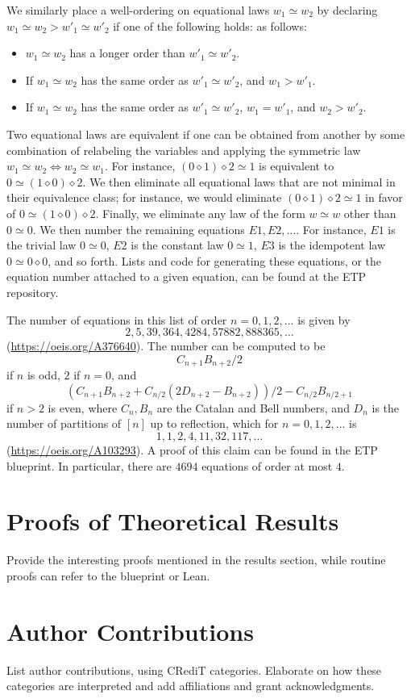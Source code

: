 \documentclass[12pt]{article}
\theoremstyle{definition}
\newcommand{\op}{\diamond}
\newcommand{\formaleq}{\simeq}
\begin{document}
We similarly place a well-ordering on equational laws $w_1 \formaleq w_2$ by declaring $w_1 \formaleq w_2 > w'_1 \formaleq w'_2$ if one of the following holds:
as follows:
\begin{itemize}
\item  $w_1 \formaleq w_2$ has a longer order than $w'_1 \formaleq w'_2$.
\item If $w_1 \formaleq w_2$ has the same order as $w'_1 \formaleq w'_2$, and $w_1 > w'_1$.
\item If $w_1 \formaleq w_2$ has the same order as $w'_1 \formaleq w'_2$, $w_1 = w'_1$, and $w_2 > w'_2$.
\end{itemize}

Two equational laws are equivalent if one can be obtained from another by some combination of relabeling the variables and applying the symmetric law $w_1 \formaleq w_2 \iff w_2 \formaleq w_1$.  For instance, $(0 \op 1) \op 2 \formaleq 1$ is equivalent to $0 \formaleq (1 \op 0) \op 2$.  We then eliminate all equational laws that are not minimal in their equivalence class; for instance, we would eliminate $(0 \op 1) \op 2 \formaleq 1$ in favor of $0 \formaleq (1 \op 0) \op 2$.  Finally, we eliminate any law of the form $w \formaleq w$ other than $0 \formaleq 0$.  We then number the remaining equations $E1, E2, \dots$.  For instance, $E1$ is the trivial law $0 \formaleq 0$, $E2$ is the constant law $0 \formaleq 1$, $E3$ is the idempotent law $0 \formaleq 0 \op 0$, and so forth.  Lists and code for generating these equations, or the equation number attached to a given equation, can be found at the ETP repository.

The number of equations in this list of order $n=0,1,2,\dots$ is given by
$$ 2, 5, 39, 364, 4284, 57882, 888365, \dots$$
(\url{https://oeis.org/A376640}).  The number can be computed to be
$$ C_{n+1} B_{n+2}/2$$
if $n$ is odd, $2$ if $n=0$, and
$$ (C_{n+1} B_{n+2}+ C_{n/2}(2D_{n+2}-B_{n+2}))/2 - C_{n/2} B_{n/2+1}$$
if $n > 2$ is even, where $C_n, B_n$ are the Catalan and Bell numbers, and $D_n$ is the number of partitions of $[n]$ up to reflection, which for $n=0,1,2,\dots$ is
$$ 1, 1, 2, 4, 11, 32, 117, \dots$$
(\url{https://oeis.org/A103293}).  A proof of this claim can be found in the ETP blueprint.  In particular, there are $4694$ equations of order at most $4$.



\section{Proofs of Theoretical Results}
Provide the interesting proofs mentioned in the results section, while routine proofs can refer to the blueprint or Lean.

\section{Author Contributions}
List author contributions, using CRediT categories. Elaborate on how these categories are interpreted and add affiliations and grant acknowledgments.



\end{document}
